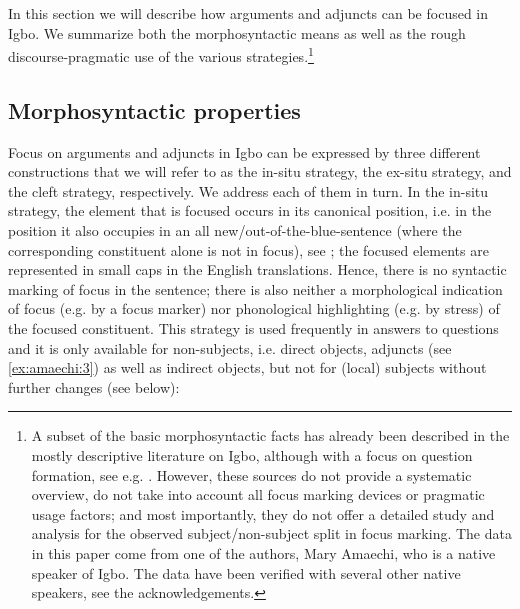 \documentclass[output=paper,colorlinks,citecolor=brown]{langscibook}
\begin{document}
In this section we will describe how arguments and adjuncts can be focused in Igbo. We summarize both the morphosyntactic means as well as the rough discourse-pragmatic use of the various strategies.\footnote{A subset of the basic morphosyntactic facts has already been described in the mostly descriptive literature on Igbo, although with a focus on question formation, see e.g. \citet{Goldsmith1981, Ikekeonwu1987, Uwalaka1991, Mmaduagwu2012, Nwankwegu2015}. However, these sources do not provide a systematic overview, do not take into account all focus marking devices or pragmatic usage factors; and most importantly, they do not offer a detailed study and analysis for the observed  subject\slash non-subject split in focus marking. The data in this paper come from one of the authors, Mary Amaechi, who is a native speaker of Igbo. The data have been verified with several other native speakers, see the acknowledgements.}

\subsection{Morphosyntactic properties}\label{sec:amaechi:2.1}\largerpage

Focus on arguments and adjuncts in Igbo can be expressed by three different constructions that we will refer to as the in-situ strategy, the ex-situ strategy, and the cleft strategy, respectively. We address each of them in turn. In the in-situ strategy, the element that is focused occurs in its canonical position, i.e. in the position it also occupies in an all new\slash out-of-the-blue-sentence (where the corresponding constituent alone is not in focus), see ; the focused elements are represented in small caps in the English translations. Hence, there is no syntactic marking of focus in the sentence; there is also neither a morphological indication of focus (e.g. by a focus marker) nor phonological highlighting (e.g. by stress) of the focused constituent. This strategy is used frequently in answers to questions and it is only available for non-subjects, i.e. direct objects, adjuncts (see \ref{ex:amaechi:3}) as well as indirect objects, but not for (local) subjects without further changes (see below):
\end{document}
